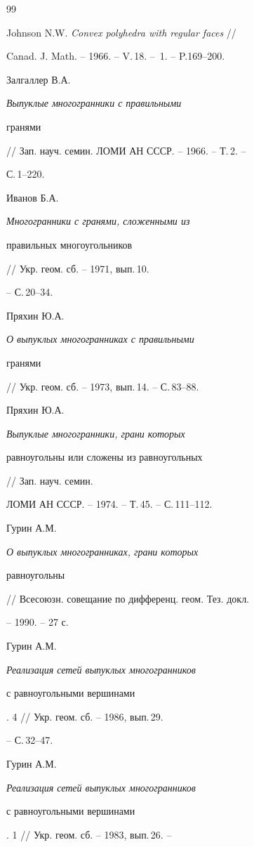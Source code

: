  


\begin{thebibliography}{99} 


 




Johnson N.W. {\em Convex polyhedra with regular faces} // 


Canad. J. Math. -- 1966. -- V.\,18. -- \No\,1. -- P.169--200. 




Залгаллер В.А. {\em Выпуклые многогранники с правильными 


гранями} // Зап. науч. семин. ЛОМИ АН СССР. -- 1966. -- Т.\,2. -- 


С.\,1--220. 




Иванов Б.А. {\em Многогранники с гранями, сложенными из 


правильных многоугольников} // Укр. геом. сб. -- 1971, вып.\,10. 


-- С.\,20--34. 




Пряхин Ю.А. {\em О выпуклых многогранниках с правильными 


гранями} // Укр. геом. сб. -- 1973, вып.\,14. -- С.\,83--88. 




Пряхин Ю.А. {\em Выпуклые многогранники, грани которых 


равноугольны или сложены из равноугольных} // Зап. науч. семин.  


ЛОМИ АН СССР. -- 1974. -- Т.\,45. -- С.\,111--112.  




Гурин А.М. {\em О выпуклых многогранниках, грани которых 


равноугольны} // Всесоюзн. совещание по дифференц. геом. Тез. докл. 


-- 1990. -- 27 с. 




Гурин А.М. {\em Реализация сетей выпуклых многогранников 


с равноугольными вершинами}. 4 // Укр. геом. сб. -- 1986, вып.\,29. 


-- С.\,32--47. 




Гурин А.М. {\em Реализация сетей выпуклых многогранников 


с равноугольными вершинами}. 1 // Укр. геом. сб. -- 1983, вып.\,26. -- 



\end{thebibliography}
